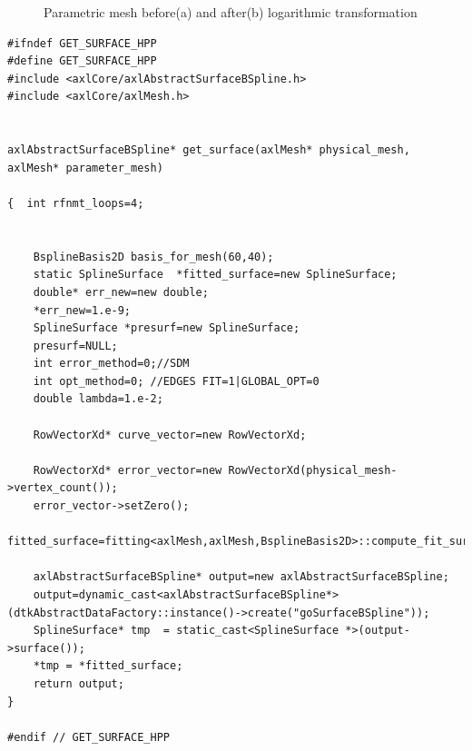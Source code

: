\documentclass[12pt,a4paper]{article}
\begin{document}
\begin{figure}[h]
  \centering
  \hfill
  \caption{Parametric mesh before(a) and  after(b) logarithmic transformation}
\end{figure}




 


 

\begin{lstlisting}[label=some-code,breaklines=true,caption=fitting process]
#ifndef GET_SURFACE_HPP
#define GET_SURFACE_HPP
#include <axlCore/axlAbstractSurfaceBSpline.h>
#include <axlCore/axlMesh.h>


axlAbstractSurfaceBSpline* get_surface(axlMesh* physical_mesh, axlMesh* parameter_mesh)

{  int rfnmt_loops=4;


    BsplineBasis2D basis_for_mesh(60,40);
    static SplineSurface  *fitted_surface=new SplineSurface;
    double* err_new=new double;
    *err_new=1.e-9;
    SplineSurface *presurf=new SplineSurface;
    presurf=NULL;
    int error_method=0;//SDM
    int opt_method=0; //EDGES FIT=1|GLOBAL_OPT=0
    double lambda=1.e-2;

    RowVectorXd* curve_vector=new RowVectorXd;

    RowVectorXd* error_vector=new RowVectorXd(physical_mesh->vertex_count());
    error_vector->setZero();
    fitted_surface=fitting<axlMesh,axlMesh,BsplineBasis2D>::compute_fit_surf(physical_mesh,parameter_mesh,basis_for_mesh,presurf,error_method,opt_method,lambda,err_new,error_vector,curve_vector,rfnmt_loops);

    axlAbstractSurfaceBSpline* output=new axlAbstractSurfaceBSpline;
    output=dynamic_cast<axlAbstractSurfaceBSpline*>(dtkAbstractDataFactory::instance()->create("goSurfaceBSpline"));
    SplineSurface* tmp  = static_cast<SplineSurface *>(output->surface());
    *tmp = *fitted_surface;
    return output;
}

#endif // GET_SURFACE_HPP


\end{lstlisting}
\end{document}
